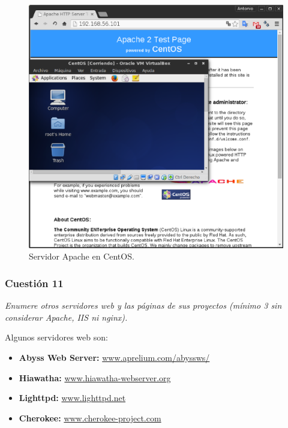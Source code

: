 \begin{figure}[H]
    \begin{center}
        \includegraphics[scale=0.35]{imagenes/img19.eps}
        \caption{Servidor Apache en CentOS.}
        \label{fig19}
    \end{center}
\end{figure}

\subsubsection{Cuestión 11}
\textit{Enumere otros servidores web y las páginas de sus proyectos (mínimo 3 sin considerar Apache, IIS ni nginx).}
\newline

Algunos servidores web son:
\begin{itemize}
  \item \textbf{Abyss Web Server: } \url{www.aprelium.com/abyssws/}
  \item \textbf{Hiawatha: } \url{www.hiawatha-webserver.org}
  \item \textbf{Lighttpd: } \url{www.lighttpd.net}
  \item \textbf{Cherokee: } \url{www.cherokee-project.com}

\end{itemize}
